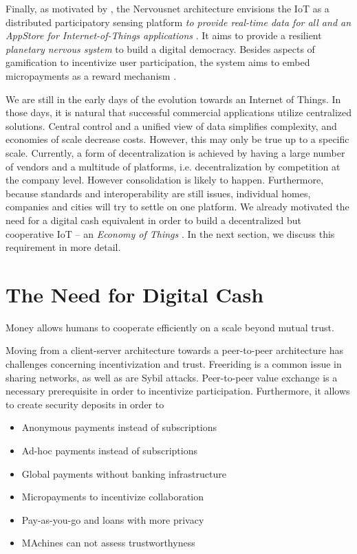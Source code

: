 Finally, as motivated by \cite{Giannotti2012}, the Nervousnet architecture envisions the IoT as a distributed participatory sensing platform \emph{to provide real-time data for all and an AppStore for Internet-of-Things applications} \parencite{7097988}. It aims to provide a resilient \emph{planetary nervous system} to build a digital democracy. Besides aspects of gamification to incentivize user participation, the system aims to embed micropayments as a reward mechanism \parencite{Helbing2015Nature}.

We are still in the early days of the evolution towards an Internet of Things. In those days, it is natural that successful commercial applications utilize centralized solutions. Central control and a unified view of data simplifies complexity, and economies of scale decrease costs. However, this may only be true up to a specific scale. Currently, a form of decentralization is achieved by having a large number of vendors and a multitude of platforms, i.e. decentralization by competition at the company level. However consolidation is likely to happen. Furthermore, because standards and interoperability are still issues, individual homes, companies and cities will try to settle on one platform.
We already motivated the need for a digital cash equivalent in order to build a decentralized but cooperative IoT -- an \emph{Economy of Things} \parencite{Pureswaran2015}. In the next section, we discuss this requirement in more detail.


\section{The Need for Digital Cash}

Money allows humans to cooperate efficiently on a scale beyond mutual trust. 




Moving from a client-server architecture towards a peer-to-peer architecture has challenges concerning incentivization and trust. Freeriding is a common issue in sharing networks, as well as are Sybil attacks. Peer-to-peer value exchange is a necessary prerequisite in order to incentivize participation. Furthermore, it allows to create security deposits in order to 
\begin{itemize}
\item Anonymous payments instead of subscriptions
\item Ad-hoc payments instead of subscriptions
\item Global payments without banking infrastructure
\item Micropayments to incentivize collaboration
\item Pay-as-you-go and loans with more privacy
\item MAchines can not assess trustworthyness

\end{itemize}

